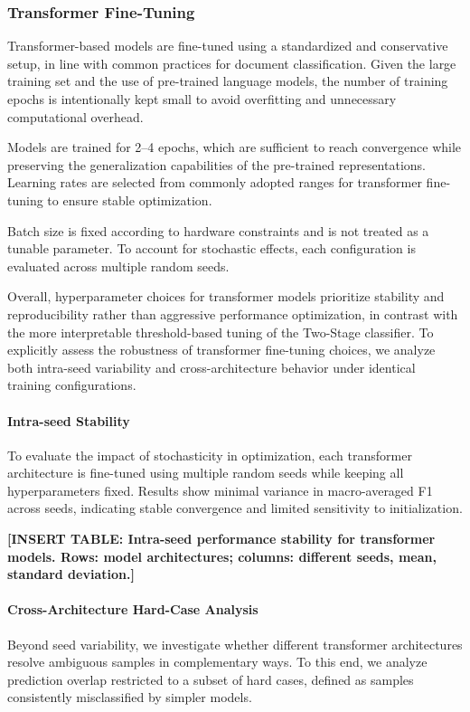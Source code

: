 \subsubsection{Transformer Fine-Tuning}

Transformer-based models are fine-tuned using a standardized and
conservative setup, in line with common practices for document
classification.
Given the large training set and the use of pre-trained language
models, the number of training epochs is intentionally kept small to
avoid overfitting and unnecessary computational overhead.

Models are trained for 2--4 epochs, which are sufficient to reach
convergence while preserving the generalization capabilities of the
pre-trained representations. Learning rates are selected from
commonly adopted ranges for transformer fine-tuning to ensure stable
optimization.

Batch size is fixed according to hardware constraints and is not
treated as a tunable parameter. To account for stochastic effects,
each configuration is evaluated across multiple random seeds.

Overall, hyperparameter choices for transformer models prioritize
stability and reproducibility rather than aggressive performance
optimization, in contrast with the more interpretable threshold-based
tuning of the Two-Stage classifier.
To explicitly assess the robustness of transformer fine-tuning choices,
we analyze both intra-seed variability and cross-architecture behavior
under identical training configurations.

\paragraph{Intra-seed Stability}
To evaluate the impact of stochasticity in optimization, each transformer
architecture is fine-tuned using multiple random seeds while keeping all
hyperparameters fixed.
Results show minimal variance in macro-averaged F1 across seeds,
indicating stable convergence and limited sensitivity to initialization.

\textbf{[INSERT TABLE: Intra-seed performance stability for transformer models.
Rows: model architectures; columns: different seeds, mean, standard deviation.]}

\paragraph{Cross-Architecture Hard-Case Analysis}
Beyond seed variability, we investigate whether different transformer
architectures resolve ambiguous samples in complementary ways.
To this end, we analyze prediction overlap restricted to a subset of
hard cases, defined as samples consistently misclassified by simpler
models.

